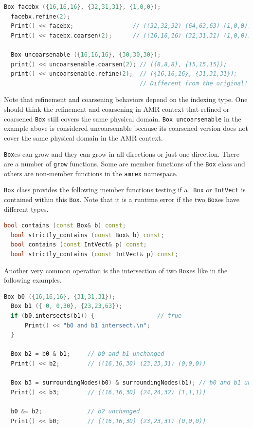 {\begin{lstlisting}[language=cpp]
  Box facebx ({16,16,16}, {32,31,31}, {1,0,0});
  facebx.refine(2);
  Print() << facebx;                 // ((32,32,32) (64,63,63) (1,0,0))
  Print() << facebx.coarsen(2);      // ((16,16,16) (32,31,31) (1,0,0))

  Box uncoarsenable ({16,16,16}, {30,30,30});
  print() << uncoarsenable.coarsen(2); // ({8,8,8}, {15,15,15});
  print() << uncoarsenable.refine(2);  // ({16,16,16}, {31,31,31});
                                       // Different from the original!
\end{lstlisting}
Note that refinement and coarsening behaviors depend on the indexing
type.  One should think the refinement and coarsening in AMR context
that refined or coarsened {\tt Box} still covers the same physical
domain.  {\tt Box uncoarsenable} in the example above is considered
uncoarsenable because its coarsened version does not cover the same
physical domain in the AMR context.

{\tt Box}es can grow and they can grow in all directions or just one
direction.  There are a number of {\tt grow} functions.  Some are
member functions of the {\tt Box} class and others are non-member
functions in the {\tt amrex} namespace. 

{\tt Box} class provides the following member functions testing if a {\tt
  Box} or {\tt IntVect} is contained within this {\tt Box}.  Note that
it is a runtime error if the two {\tt Box}es have different types.
\begin{lstlisting}[language=cpp]
  bool contains (const Box& b) const;
  bool strictly_contains (const Box& b) const;
  bool contains (const IntVect& p) const;
  bool strictly_contains (const IntVect& p) const;
\end{lstlisting}

Another very common operation is the intersection of two {\tt Box}es
like in the following examples.
\begin{lstlisting}[language=cpp]
  Box b0 ({16,16,16}, {31,31,31});
  Box b1 ({ 0, 0,30}, {23,23,63});
  if (b0.intersects(b1)) {                  // true
      Print() << "b0 and b1 intersect.\n"; 
  }

  Box b2 = b0 & b1;     // b0 and b1 unchanged
  Print() << b2;        // ((16,16,30) (23,23,31) (0,0,0))

  Box b3 = surroundingNodes(b0) & surroundingNodes(b1); // b0 and b1 unchanged
  Print() << b3;        // ((16,16,30) (24,24,32) (1,1,1))

  b0 &= b2;             // b2 unchanged
  Print() << b0;        // ((16,16,30) (23,23,31) (0,0,0))


\end{lstlisting}}
